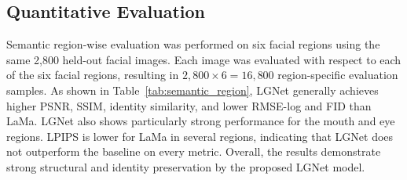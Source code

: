 \subsection{Quantitative Evaluation}

Semantic region-wise evaluation was performed on six facial regions
using the same 2,800 held-out facial images. Each image was evaluated
with respect to each of the six facial regions, resulting in
$2,800 \times 6 = 16,800$ region-specific evaluation samples. As shown in Table~\ref{tab:semantic_region},
LGNet generally achieves higher PSNR, SSIM, identity similarity, and lower
RMSE-log and FID than LaMa. LGNet also shows particularly strong performance
for the mouth and eye regions. LPIPS is lower for LaMa in several regions,
indicating that LGNet does not outperform the baseline on every metric.
Overall, the results demonstrate strong structural and identity preservation
by the proposed LGNet model.

